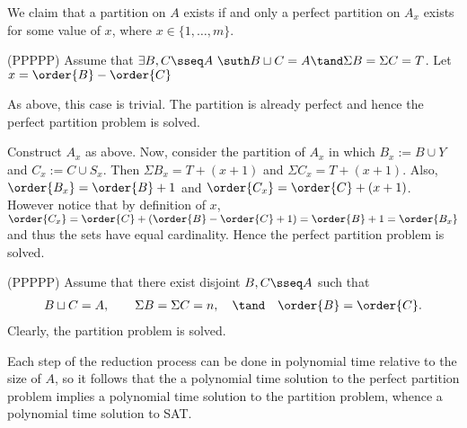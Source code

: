 \documentclass{article}
\begin{document}
\begin{solution}
  We claim that a partition on \( A \) exists if and only a perfect partition on \( A_x \) exists for some value of \( x \), where \( x\in \{1,\ldots,m\} \).

  \begin{subproof}[Correctness.]
    (PP\imp PPP)
    Assume that \( \exists B,C\sseq A\ \suth B\sqcup C = A \tand \Sigma B = \Sigma C = T \). Let \( x=\order{B}-\order{C} \)

    \begin{subproof}[Case 1 (\( x = 0 \)).]
      As above, this case is trivial. The partition is already perfect and hence the perfect partition problem is solved.
    \end{subproof}
    \begin{subproof}
      Construct \( A_x \) as above.
      Now, consider the partition of \( A_x \) in which \( B_x := B\cup Y \) and \( C_x := C\cup S_x \).
      Then \( \Sigma B_x = T + (x+1) \) and \( \Sigma C_x = T + (x+1) \).
      Also, \( \order{B_x} = \order{B}+1 \) and \( \order{C_x} = \order{C}+(x+1) \).
      However notice that by definition of \( x \), \( \order{C_x} = \order{C} + (\order{B} - \order{C} + 1) = \order{B} + 1 = \order{B_x} \) and thus the sets have equal cardinality.
      Hence the perfect partition problem is solved.
    \end{subproof}

    (PP\pmi PPP)
    Assume that there exist disjoint \( B,C\sseq A \) such that
    \begin{align*}
      B\sqcup C = A, \qquad \Sigma B = \Sigma C = n, \quad \tand \quad \order{B}=\order{C}.
    \end{align*}
    Clearly, the partition problem is solved.
  \end{subproof}
  Each step of the reduction process can be done in polynomial time relative to the size of \( A \), so it follows that the a polynomial time solution to the perfect partition problem implies a polynomial time solution to the partition problem, whence a polynomial time solution to SAT.
\end{solution}
\pagebreak
\end{document}
